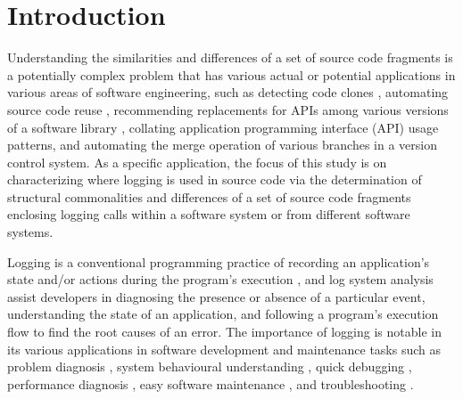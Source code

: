 
\chapter{Introduction}  \label{Introduction}

Understanding the similarities and differences of a set of source code fragments is a potentially complex problem that has various actual or potential applications in various areas of software engineering, such as detecting code clones \cite{bulychev2009evaluation}, automating source code reuse \cite{2008:fse:cottrell}, recommending replacements for APIs among various versions of a software library \cite{2014:uofc:cossette}, collating application programming interface (API) usage patterns, and automating the merge operation of various branches in a version control system. As a specific application, the focus of this study is on characterizing where logging is used in source code via the determination of structural commonalities and differences of a set of source code fragments enclosing logging calls within a software system or from different software systems.

Logging is a conventional programming practice of recording an application's state and/or actions during the program's execution \cite{gupta2005pro}, and log system analysis assist developers in diagnosing the presence or absence of a particular event, understanding the state of an application, and following a program's execution flow to find the root causes of an error. The importance of logging is notable in its various applications in software development and maintenance tasks such as problem diagnosis \cite{lou2010mining}, system behavioural understanding \cite{fu2013contextual}, quick debugging \cite{gupta2005pro}, performance diagnosis \cite{nagaraj2012structured}, easy software maintenance \cite{gupta2005pro}, and troubleshooting \cite{fu2009execution}.


